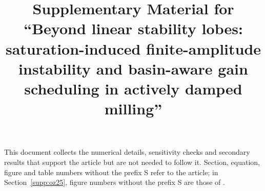 \documentclass[preprint,12pt]{elsarticle}
\begin{document}
\begin{frontmatter}
\title{Supplementary Material for ``Beyond linear stability lobes: saturation-induced finite-amplitude instability and basin-aware gain scheduling in actively damped milling''}
\end{frontmatter}
This document collects the numerical details, sensitivity checks and secondary results that support the article but are not needed to follow it. Section, equation, figure and table numbers without the prefix S refer to the article; in Section~\ref{supp:oz25}, figure numbers without the prefix S are those of \citet{ozsoy2025frequency}.










\end{document}
